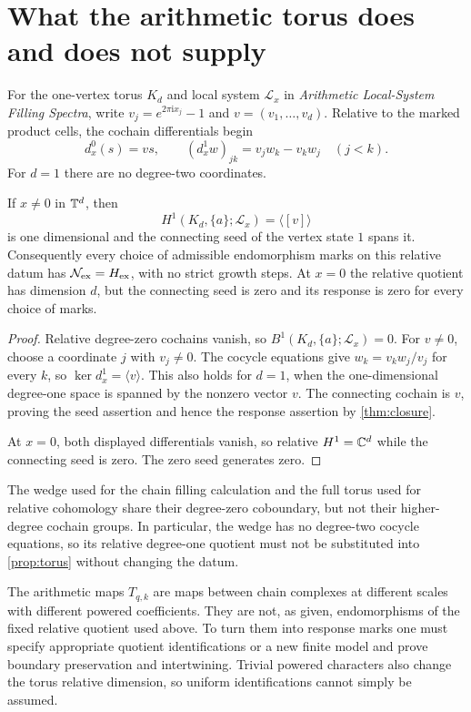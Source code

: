 \documentclass[11pt,a4paper]{article}
\begin{document}
\section{What the arithmetic torus does and does not supply}
\label{sec:torus}

For the one-vertex torus $K_d$ and local system $\mathcal L_x$ in
\emph{Arithmetic Local-System Filling Spectra}, write
$v_j=e^{2\pi\mathrm i x_j}-1$ and $v=(v_1,\ldots,v_d)$.
Relative to the marked product cells, the cochain differentials begin
\[
 d_x^0(s)=vs,\qquad
 (d_x^1w)_{jk}=v_jw_k-v_kw_j\quad(j<k).
\]
For $d=1$ there are no degree-two coordinates.

\begin{proposition}
\label{prop:torus}
If $x\ne0$ in $\mathbb T^d$, then
\[
 H^1(K_d,\{a\};\mathcal L_x)=\langle[v]\rangle
\]
is one dimensional and the connecting seed of the vertex state $1$
spans it.  Consequently every choice of admissible endomorphism marks
on this relative datum has $\mathcal N_{\mathrm{ex}}=H_{\mathrm{ex}}$, with no strict growth steps.
At $x=0$ the relative quotient has dimension $d$, but the connecting
seed is zero and its response is zero for every choice of marks.
\end{proposition}

\begin{proof}
Relative degree-zero cochains vanish, so $B^1(K_d,\{a\};\mathcal L_x)=0$.
For $v\ne0$, choose a coordinate $j$ with $v_j\ne0$.  The cocycle
equations give $w_k=v_k w_j/v_j$ for every $k$, so
$\ker d_x^1=\langle v\rangle$.  This also holds for $d=1$, when the
one-dimensional degree-one space is spanned by the nonzero vector $v$.
The connecting cochain is $v$, proving the seed assertion and hence the
response assertion by \cref{thm:closure}.

At $x=0$, both displayed differentials vanish, so relative $H^1=\mathbb C^d$
while the connecting seed is zero.  The zero seed generates zero.
\end{proof}

The wedge used for the chain filling calculation and the full torus
used for relative cohomology share their degree-zero coboundary, but not
their higher-degree cochain groups.  In particular, the wedge has no
degree-two cocycle equations, so its relative degree-one quotient must
not be substituted into \cref{prop:torus} without changing the datum.

The arithmetic maps $T_{q,k}$ are maps between chain complexes at different
scales with different powered coefficients.  They are not, as given,
endomorphisms of the fixed relative quotient used above.  To turn them
into response marks one must specify appropriate quotient identifications
or a new finite model and prove boundary preservation and intertwining.
Trivial powered characters also change the torus relative dimension, so
uniform identifications cannot simply be assumed.
\end{document}
